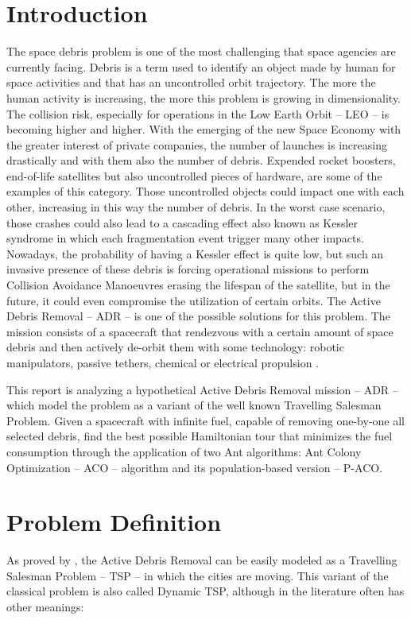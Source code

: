 \documentclass[a4paper,9pt,journal,twoside,compsoc]{PPIEEEtran}
\begin{document}
\section{Introduction}
The space debris problem is one of the most challenging that space agencies are currently facing. Debris is a term used to identify an object made by human for space activities and that has an uncontrolled orbit trajectory. The more the human activity is increasing, the more this problem is growing in dimensionality. The collision risk, especially for operations in the Low Earth Orbit \cite{leo} -- LEO -- is becoming higher and higher. With the emerging of the new Space Economy with the greater interest of private companies, the number of launches is increasing drastically and with them also the number of debris. Expended rocket boosters, end-of-life satellites but also uncontrolled pieces of hardware, are some of the examples of this category. Those uncontrolled objects could impact one with each other, increasing in this way the number of debris. In the worst case scenario, those crashes could also lead to a cascading effect also known as Kessler syndrome \cite{kessler} in which each fragmentation event trigger many other impacts. Nowadays, the probability of having a Kessler effect is quite low, but such an invasive presence of these debris is forcing operational missions to perform Collision Avoidance Manoeuvres \cite{cam} erasing the lifespan of the satellite, but in the future, it could even compromise the utilization of certain orbits.
The Active Debris Removal -- ADR -- is one of the possible solutions for this problem. The mission consists of a spacecraft that rendezvous with a certain amount of space debris and then actively de-orbit them with some technology: robotic manipulators, passive tethers, chemical or electrical propulsion \cite{esatech}.

This report is analyzing a hypothetical Active Debris Removal mission -- ADR --  which model the problem as a variant of the well known Travelling Salesman Problem. Given a spacecraft with infinite fuel, capable of removing one-by-one all selected debris, find the best possible Hamiltonian tour that minimizes the fuel consumption through the application of two Ant algorithms: Ant Colony Optimization -- ACO -- algorithm and its population-based version -- P-ACO.

\section{Problem Definition}
As proved by \cite{izzo} \cite{adr_tsp1} \cite{adr_tsp2}, the Active Debris Removal can be easily modeled as a Travelling Salesman Problem -- TSP -- in which the cities are moving. This variant of the classical problem is also called Dynamic TSP, although in the literature often has other meanings:
\end{document}
